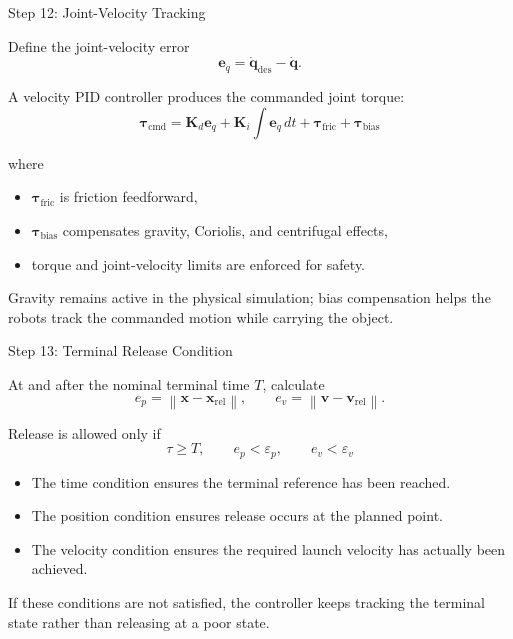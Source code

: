 \documentclass[aspectratio=169]{beamer}
\newcommand{\vect}[1]{\bm{#1}}
\begin{document}
\begin{frame}{Step 12: Joint-Velocity Tracking}

Define the joint-velocity error
\[
\vect{e}_{\dot q}
=\dot{\vect{q}}_{\mathrm{des}}-\dot{\vect{q}}.
\]

A velocity PID controller produces the commanded joint torque:
\[
\boxed{
\vect{\tau}_{\mathrm{cmd}}
=\vect{K}_{d}\vect{e}_{\dot q}
+\vect{K}_{i}\int\vect{e}_{\dot q}\,dt
+\vect{\tau}_{\mathrm{fric}}
+\vect{\tau}_{\mathrm{bias}}
}
\]

where
\begin{itemize}
    \item $\vect{\tau}_{\mathrm{fric}}$ is friction feedforward,
    \item $\vect{\tau}_{\mathrm{bias}}$ compensates gravity, Coriolis,
          and centrifugal effects,
    \item torque and joint-velocity limits are enforced for safety.
\end{itemize}

Gravity remains active in the physical simulation; bias compensation helps
the robots track the commanded motion while carrying the object.

\end{frame}

\begin{frame}{Step 13: Terminal Release Condition}

At and after the nominal terminal time $T$, calculate
\[
e_p=\left\|\vect{x}-\vect{x}_{\mathrm{rel}}\right\|,
\qquad
e_v=\left\|\vect{v}-\vect{v}_{\mathrm{rel}}\right\|.
\]

Release is allowed only if
\[
\boxed{
\tau\geq T,
\qquad
e_p<\varepsilon_p,
\qquad
e_v<\varepsilon_v
}
\]

\begin{itemize}
    \item The time condition ensures the terminal reference has been reached.
    \item The position condition ensures release occurs at the planned point.
    \item The velocity condition ensures the required launch velocity has
          actually been achieved.
\end{itemize}

If these conditions are not satisfied, the controller keeps tracking the
terminal state rather than releasing at a poor state.

\end{frame}
\end{document}
